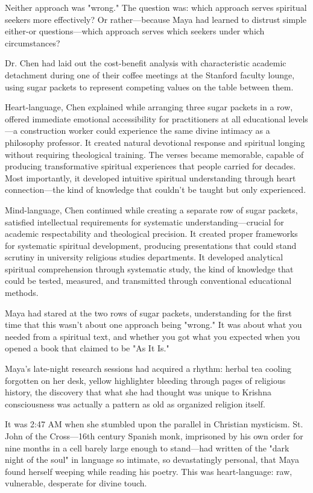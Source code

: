 \documentclass[12pt,twoside]{book}
\begin{document}
Neither approach was "wrong." The question was: which approach serves spiritual seekers more effectively? Or rather—because Maya had learned to distrust simple either-or questions—which approach serves which seekers under which circumstances?

Dr. Chen had laid out the cost-benefit analysis with characteristic academic detachment during one of their coffee meetings at the Stanford faculty lounge, using sugar packets to represent competing values on the table between them.

Heart-language, Chen explained while arranging three sugar packets in a row, offered immediate emotional accessibility for practitioners at all educational levels—a construction worker could experience the same divine intimacy as a philosophy professor. It created natural devotional response and spiritual longing without requiring theological training. The verses became memorable, capable of producing transformative spiritual experiences that people carried for decades. Most importantly, it developed intuitive spiritual understanding through heart connection—the kind of knowledge that couldn't be taught but only experienced.

Mind-language, Chen continued while creating a separate row of sugar packets, satisfied intellectual requirements for systematic understanding—crucial for academic respectability and theological precision. It created proper frameworks for systematic spiritual development, producing presentations that could stand scrutiny in university religious studies departments. It developed analytical spiritual comprehension through systematic study, the kind of knowledge that could be tested, measured, and transmitted through conventional educational methods.

Maya had stared at the two rows of sugar packets, understanding for the first time that this wasn't about one approach being "wrong." It was about what you needed from a spiritual text, and whether you got what you expected when you opened a book that claimed to be "As It Is."

Maya's late-night research sessions had acquired a rhythm: herbal tea cooling forgotten on her desk, yellow highlighter bleeding through pages of religious history, the discovery that what she had thought was unique to Krishna consciousness was actually a pattern as old as organized religion itself.

It was 2:47 AM when she stumbled upon the parallel in Christian mysticism. St. John of the Cross—16th century Spanish monk, imprisoned by his own order for nine months in a cell barely large enough to stand—had written of the "dark night of the soul" in language so intimate, so devastatingly personal, that Maya found herself weeping while reading his poetry. This was heart-language: raw, vulnerable, desperate for divine touch.
\end{document}
